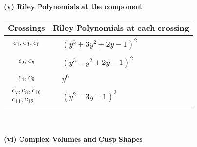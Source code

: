 \documentclass[1p]{elsarticle_modified}
\theoremstyle{definition}
\begin{document}
\newpage\renewcommand{\arraystretch}{1}
\flushleft \textbf{(v) Riley Polynomials at the component}\newline \\
\begin{tabular}{m{50pt}|m{274pt}}
Crossings & \hspace{64pt}Riley Polynomials at each crossing \\
\hline $$\begin{aligned}c_{1},c_{3},c_{6}\end{aligned}$$&$\begin{aligned}
&(y^3+3 y^2+2 y-1)^2
\end{aligned}$\\
\hline $$\begin{aligned}c_{2},c_{5}\end{aligned}$$&$\begin{aligned}
&(y^3- y^2+2 y-1)^2
\end{aligned}$\\
\hline $$\begin{aligned}c_{4},c_{9}\end{aligned}$$&$\begin{aligned}
&y^6
\end{aligned}$\\
\hline $$\begin{aligned}c_{7},c_{8},c_{10}\\c_{11},c_{12}\end{aligned}$$&$\begin{aligned}
&(y^2-3 y+1)^3
\end{aligned}$\\
\hline
\end{tabular}\\~\\
\newpage\flushleft \textbf{(vi) Complex Volumes and Cusp Shapes}
\end{document}
